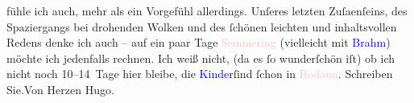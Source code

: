                fühle ich auch, mehr als ein Vorgefühl {\pb}allerdings. Unſeres letzten Zuſa{\geminationm}enſeins, des Spaziergangs bei drohenden Wolken und des
               ſchönen leichten und inhaltsvollen Redens denke ich auch – auf ein paar Tage \textcolor{pink}{Semmering}{}\ledrightnote{\textcolor{pink}{Semmering}} (vielleicht mit \textcolor{blue}{Brahm}{}\ledrightnote{\textcolor{blue}{Otto Brahm}}) möchte ich jedenfalls rechnen.\pend
           \pstart
           Ich weiß nicht, (da es ſo wunderſchön iſt) ob ich nicht noch 10–14 Tage hier bleibe,
               die \textcolor{blue}{Kinder}{}ſind ſchon in \textcolor{pink}{Rodaun}{}\ledrightnote{\textcolor{pink}{Rodaun}}.\pend
           \pstart
            Schreiben Sie.\hspace*{1.5em}Von Herzen\pend
           \pstart \spacefill\mbox{Hugo.}\pend{}\endnumbering{}  
      